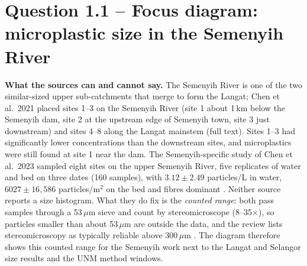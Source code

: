 \documentclass[11pt,a4paper]{article}
\newcommand{\um}{\,\ensuremath{\mu}m}
\newcommand{\flag}[1]{\textcolor{accent}{\textbf{#1}}}
\begin{document}
\section{Question 1.1 -- Focus diagram: microplastic size in the Semenyih River}
\flag{What the sources can and cannot say.} The Semenyih River is one of the two similar-sized upper sub-catchments that merge to form the Langat; Chen et al.\ 2021 placed sites 1--3 on the Semenyih River (site 1 about 1\,km below the Semenyih dam, site 2 at the upstream edge of Semenyih town, site 3 just downstream) and sites 4--8 along the Langat mainstem \cite{chen21a} (full text). Sites 1--3 had significantly lower concentrations than the downstream sites, and microplastics were still found at site 1 near the dam. The Semenyih-specific study of Chen et al.\ 2023 sampled eight sites on the upper Semenyih River, five replicates of water and bed on three dates (160 samples), with $3.12\pm2.49$ particles/L in water, $6027\pm16{,}586$ particles/m$^{2}$ on the bed and fibres dominant \cite{chen23}. Neither source reports a size histogram. What they do fix is the \emph{counted range}: both pass samples through a 53\um{} sieve and count by stereomicroscope (8--35$\times$), so particles smaller than about 53\um{} are outside the data, and the review lists stereomicroscopy as typically reliable above 300\um{} \cite{bouida26}. The diagram therefore shows this counted range for the Semenyih work next to the Langat and Selangor size results and the UNM method windows.
\end{document}
